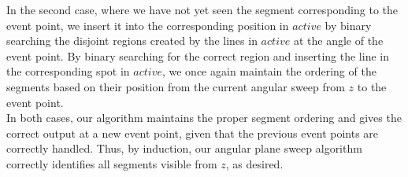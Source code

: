 \documentclass[11pt]{article}
\begin{document}
\begin{enumerate}
    In the second case, where we have not yet seen the segment corresponding to the event point, we insert it into the corresponding position in $active$ by binary searching the disjoint regions created by the lines in $active$ at the angle of the event point. By binary searching for the correct region and inserting the line in the corresponding spot in $active$, we once again maintain the ordering of the segments based on their position from the current angular sweep from $z$ to the event point. \\

    In both cases, our algorithm maintains the proper segment ordering and gives the correct output at a new event point, given that the previous event points are correctly handled. Thus, by induction, our angular plane sweep algorithm correctly identifies all segments visible from $z$, as desired.
    

    
    \newpage

\end{enumerate}
\end{document}
